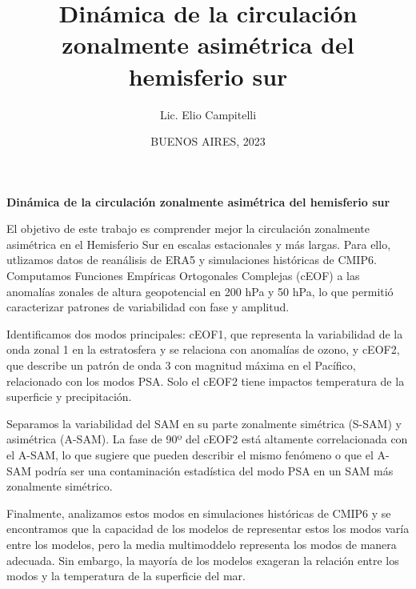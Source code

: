 \documentclass[12pt,oneside,a4paper]{reedthesis}
\title{Dinámica de la circulación zonalmente asimétrica del hemisferio sur}
\author{Lic. Elio Campitelli}
\date{BUENOS AIRES, 2023}
\begin{document}
  \maketitle

\frontmatter %
\pagestyle{empty} %


  \begin{resumen}
    \textbf{Dinámica de la circulación zonalmente asimétrica del hemisferio sur}

    El objetivo de este trabajo es comprender mejor la circulación zonalmente asimétrica en el Hemisferio Sur en escalas estacionales y más largas. Para ello, utlizamos datos de reanálisis de ERA5 y simulaciones históricas de CMIP6. Computamos Funciones Empíricas Ortogonales Complejas (cEOF) a las anomalías zonales de altura geopotencial en 200 hPa y 50 hPa, lo que permitió caracterizar patrones de variabilidad con fase y amplitud.

    Identificamos dos modos principales: cEOF1, que representa la variabilidad de la onda zonal 1 en la estratosfera y se relaciona con anomalías de ozono, y cEOF2, que describe un patrón de onda 3 con magnitud máxima en el Pacífico, relacionado con los modos PSA.
    Solo el cEOF2 tiene impactos temperatura de la superficie y precipitación.

    Separamos la variabilidad del SAM en su parte zonalmente simétrica (S-SAM) y asimétrica (A-SAM).
    La fase de 90º del cEOF2 está altamente correlacionada con el A-SAM, lo que sugiere que pueden describir el mismo fenómeno o que el A-SAM podría ser una contaminación estadística del modo PSA en un SAM más zonalmente simétrico.

    Finalmente, analizamos estos modos en simulaciones históricas de CMIP6 y se encontramos que la capacidad de los modelos de representar estos los modos varía entre los modelos, pero la media multimoddelo representa los modos de manera adecuada.
    Sin embargo, la mayoría de los modelos exageran la relación entre los modos y la temperatura de la superficie del mar.
  \end{resumen}
\end{document}
